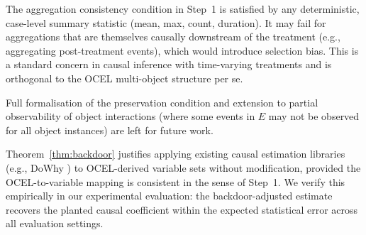 \begin{remark}
The aggregation consistency condition in Step~1 is satisfied by any
deterministic, case-level summary statistic (mean, max, count, duration).
It may fail for aggregations that are themselves causally downstream of
the treatment (e.g., aggregating post-treatment events), which would
introduce selection bias. This is a standard concern in causal inference
with time-varying treatments and is orthogonal to the OCEL multi-object
structure per se.

Full formalisation of the preservation condition and extension to partial
observability of object interactions (where some events in $E$ may not be
observed for all object instances) are left for future work.
\end{remark}

\begin{remark}
Theorem~\ref{thm:backdoor} justifies applying existing causal estimation
libraries (e.g., DoWhy \citep{sharma2020dowhy}) to OCEL-derived variable
sets without modification, provided the OCEL-to-variable mapping is
consistent in the sense of Step~1. We verify this empirically in our
experimental evaluation: the backdoor-adjusted estimate recovers the
planted causal coefficient within the expected statistical error across
all evaluation settings.
\end{remark}
